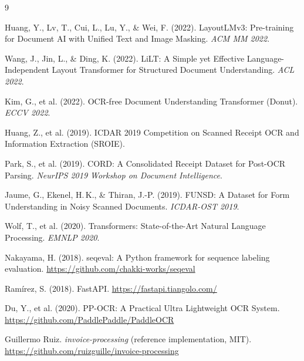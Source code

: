 \documentclass[12pt,a4paper]{article}
\begin{document}
\newpage
\begin{thebibliography}{9}

 Huang, Y., Lv, T., Cui, L., Lu, Y., \& Wei, F. (2022). LayoutLMv3: Pre-training for Document AI with Unified Text and Image Masking. \textit{ACM MM 2022}.

 Wang, J., Jin, L., \& Ding, K. (2022). LiLT: A Simple yet Effective Language-Independent Layout Transformer for Structured Document Understanding. \textit{ACL 2022}.

 Kim, G., et al. (2022). OCR-free Document Understanding Transformer (Donut). \textit{ECCV 2022}.

 Huang, Z., et al. (2019). ICDAR 2019 Competition on Scanned Receipt OCR and Information Extraction (SROIE).

 Park, S., et al. (2019). CORD: A Consolidated Receipt Dataset for Post-OCR Parsing. \textit{NeurIPS 2019 Workshop on Document Intelligence}.

 Jaume, G., Ekenel, H.\,K., \& Thiran, J.-P. (2019). FUNSD: A Dataset for Form Understanding in Noisy Scanned Documents. \textit{ICDAR-OST 2019}.

 Wolf, T., et al. (2020). Transformers: State-of-the-Art Natural Language Processing. \textit{EMNLP 2020}.

 Nakayama, H. (2018). seqeval: A Python framework for sequence labeling evaluation. \url{https://github.com/chakki-works/seqeval}

 Ram\'irez, S. (2018). FastAPI. \url{https://fastapi.tiangolo.com/}

 Du, Y., et al. (2020). PP-OCR: A Practical Ultra Lightweight OCR System. \url{https://github.com/PaddlePaddle/PaddleOCR}

 Guillermo Ruiz. \textit{invoice-processing} (reference implementation, MIT). \url{https://github.com/ruizguille/invoice-processing}

\end{thebibliography}
\end{document}

